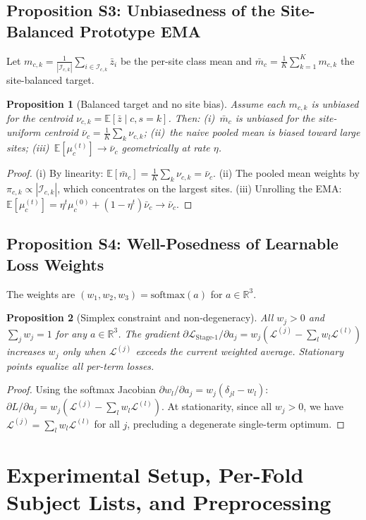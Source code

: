 \documentclass[runningheads]{llncs}
\newtheorem{proposition}{Proposition}[section]
\begin{document}
\subsection{Proposition S3: Unbiasedness of the Site-Balanced Prototype EMA}
Let $m_{c,k}=\frac{1}{|\mathcal{I}_{c,k}|}\sum_{i\in\mathcal{I}_{c,k}}\bar z_i$ be the per-site class mean and $\bar m_c=\frac{1}{K}\sum_{k=1}^{K} m_{c,k}$ the site-balanced target.
\begin{proposition}[Balanced target and no site bias]\label{prop:proto}
Assume each $m_{c,k}$ is unbiased for the centroid $\nu_{c,k}=\mathbb{E}[\bar z\mid c,s{=}k]$. Then: (i)~$\bar m_c$ is unbiased for the site-uniform centroid $\bar\nu_c=\frac1K\sum_k\nu_{c,k}$; (ii)~the naive pooled mean is biased toward large sites; (iii)~$\mathbb{E}[\mu_c^{(t)}]\to\bar\nu_c$ geometrically at rate $\eta$.
\end{proposition}
\begin{proof}
(i) By linearity: $\mathbb{E}[\bar m_c]=\frac1K\sum_k\nu_{c,k}=\bar\nu_c$. (ii) The pooled mean weights by $\pi_{c,k}\propto|\mathcal{I}_{c,k}|$, which concentrates on the largest sites. (iii) Unrolling the EMA: $\mathbb{E}[\mu_c^{(t)}]=\eta^t\mu_c^{(0)}+(1-\eta^t)\bar\nu_c\to\bar\nu_c$.
\end{proof}
\subsection{Proposition S4: Well-Posedness of Learnable Loss Weights}
The weights are $(w_1,w_2,w_3)=\mathrm{softmax}(a)$ for $a\in\mathbb{R}^3$.
\begin{proposition}[Simplex constraint and non-degeneracy]\label{prop:weights}
All $w_j>0$ and $\sum_j w_j=1$ for any $a\in\mathbb{R}^3$. The gradient $\partial\mathcal{L}_{\mathrm{Stage\text{-}1}}/\partial a_j = w_j(\mathcal{L}^{(j)}-\sum_l w_l\mathcal{L}^{(l)})$ increases $w_j$ only when $\mathcal{L}^{(j)}$ exceeds the current weighted average. Stationary points equalize all per-term losses.
\end{proposition}
\begin{proof}
Using the softmax Jacobian $\partial w_l/\partial a_j=w_j(\delta_{jl}-w_l)$: $\partial L/\partial a_j=w_j(\mathcal{L}^{(j)}-\sum_l w_l\mathcal{L}^{(l)})$. At stationarity, since all $w_j>0$, we have $\mathcal{L}^{(j)}=\sum_l w_l\mathcal{L}^{(l)}$ for all $j$, precluding a degenerate single-term optimum.
\end{proof}
%
\section{Experimental Setup, Per-Fold Subject Lists, and Preprocessing}
\label{app:setup}
\end{document}
